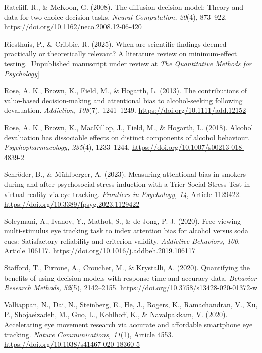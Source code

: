 \documentclass[authordate, empirical]{jote-new-article}
\begin{document}
	Ratcliff, R., \& McKoon, G. (2008). The diffusion decision model: Theory and data for two-choice decision tasks. \emph{Neural Computation, 20}(4), 873--922. \url{https://doi.org/10.1162/neco.2008.12-06-420}



	Riesthuis, P., \& Cribbie, R. (2025). When are scientific findings deemed practically or theoretically relevant? A literature review on minimum-effect testing. [Unpublished manuscript under review at \emph{The Quantitative Methods for Psychology}]



	Rose, A. K., Brown, K., Field, M., \& Hogarth, L. (2013). The contributions of value-based decision-making and attentional bias to alcohol-seeking following devaluation. \emph{Addiction, 108}(7), 1241--1249. \url{https://doi.org/10.1111/add.12152}



	Rose, A. K., Brown, K., MacKillop, J., Field, M., \& Hogarth, L. (2018). Alcohol devaluation has dissociable effects on distinct components of alcohol behaviour. \emph{Psychopharmacology, 235}(4), 1233--1244. \url{https://doi.org/10.1007/s00213-018-4839-2}



	Schröder, B., \& Mühlberger, A. (2023). Measuring attentional bias in smokers during and after psychosocial stress induction with a Trier Social Stress Test in virtual reality via eye tracking. \emph{Frontiers in Psychology, 14}, Article 1129422. \url{https://doi.org/10.3389/fpsyg.2023.1129422}



	Soleymani, A., Ivanov, Y., Mathot, S., \& de Jong, P. J. (2020). Free-viewing multi-stimulus eye tracking task to index attention bias for alcohol versus soda cues: Satisfactory reliability and criterion validity. \emph{Addictive Behaviors, 100}, Article 106117. \url{https://doi.org/10.1016/j.addbeh.2019.106117}



	Stafford, T., Pirrone, A., Croucher, M., \& Krystalli, A. (2020). Quantifying the benefits of using decision models with response time and accuracy data. \emph{Behavior Research Methods, 52}(5), 2142--2155. \url{https://doi.org/10.3758/s13428-020-01372-w}



	Valliappan, N., Dai, N., Steinberg, E., He, J., Rogers, K., Ramachandran, V., Xu, P., Shojaeizadeh, M., Guo, L., Kohlhoff, K., \& Navalpakkam, V. (2020). Accelerating eye movement research via accurate and affordable smartphone eye tracking. \emph{Nature Communications, 11}(1), Article 4553. \url{https://doi.org/10.1038/s41467-020-18360-5}
\end{document}
